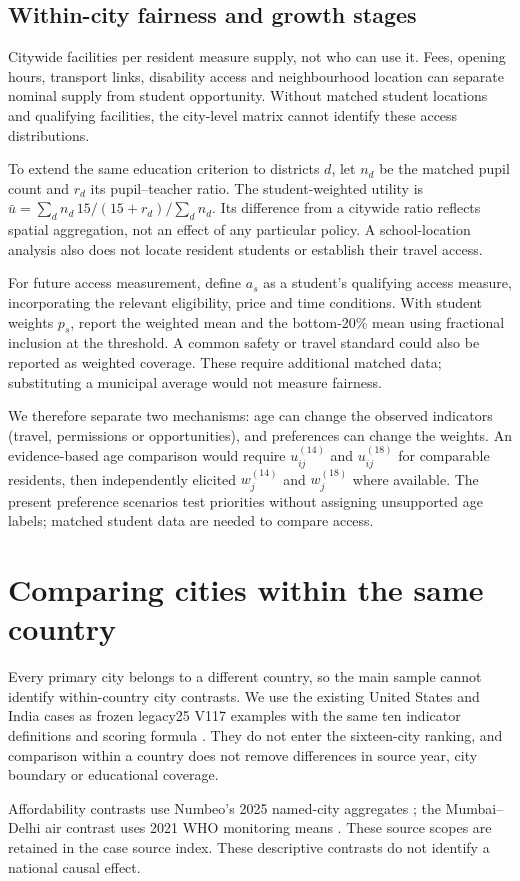\subsection{Within-city fairness and growth stages}
Citywide facilities per resident measure supply, not who can use it. Fees,
opening hours, transport links, disability access and neighbourhood location
can separate nominal supply from student opportunity. Without matched student
locations and qualifying facilities, the city-level matrix cannot identify
these access distributions.

\EquityCase
To extend the same education criterion to districts $d$, let $n_d$ be the
matched pupil count and $r_d$ its pupil--teacher ratio. The student-weighted
utility is $\bar u=\sum_d n_d\,15/(15+r_d)/\sum_dn_d$.
Its difference from a citywide ratio reflects spatial aggregation, not an
effect of any particular policy. A school-location analysis also does not locate
resident students or establish their travel access.

For future access measurement, define $a_s$ as a student's qualifying access
measure, incorporating the relevant eligibility, price and time conditions.
With student weights $p_s$, report the weighted mean and the bottom-20\%
mean using fractional inclusion at the threshold. A common safety or travel
standard could also be reported as weighted coverage. These require additional
matched data; substituting a municipal average would not measure fairness.

\AgeCase
We therefore separate two mechanisms: age can change the observed indicators
(travel, permissions or opportunities), and preferences can change the weights.
An evidence-based age comparison would require $u_{ij}^{(14)}$ and
$u_{ij}^{(18)}$ for comparable residents, then independently elicited
$w_j^{(14)}$ and $w_j^{(18)}$ where available. The present preference scenarios
test priorities without assigning unsupported age labels; matched student data
are needed to compare access.

\section{Comparing cities within the same country}
Every primary city belongs to a different country, so the main sample cannot
identify within-country city contrasts. We use the existing United States and
India cases as frozen legacy25 V117 examples with the same ten indicator
definitions and scoring formula \cite{legacycase}. They do not enter the sixteen-city ranking,
and comparison within a country does not remove differences in source year,
city boundary or educational coverage.



\CountryInterpretation
Affordability contrasts use Numbeo's 2025 named-city aggregates
\cite{numbeocase}; the Mumbai--Delhi air contrast uses 2021 WHO monitoring
means \cite{whocase}. These source scopes are retained in the case source index.
These descriptive contrasts do not identify a national causal effect.
